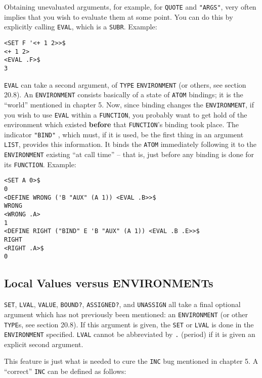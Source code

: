 \documentclass[a4paper]{scrbook}
\begin{document}
Obtaining unevaluated arguments, for example, for \texttt{QUOTE} and \texttt{"ARGS"}, very often
implies that you wish to evaluate them at some point. You can do this by explicitly calling
\texttt{EVAL}, which is a \texttt{SUBR}. Example:

\begin{verbatim}
<SET F '<+ 1 2>>$
<+ 1 2>
<EVAL .F>$
3
\end{verbatim}

\texttt{EVAL} can take a second argument, of \texttt{TYPE} \texttt{ENVIRONMENT} (or
others, see section 20.8). An \texttt{ENVIRONMENT} consists basically of a state of \texttt{ATOM} bindings; it is the
``world'' mentioned in chapter 5. Now, since binding changes the \texttt{ENVIRONMENT}, if you wish to use \texttt{EVAL}
within a \texttt{FUNCTION}, you probably want to get hold of the environment which existed
\textbf{before} that \texttt{FUNCTION}'s binding took place. The indicator \texttt{"BIND"}
, which must, if it is used, be the first thing in an argument \texttt{LIST}, provides this
information. It binds the \texttt{ATOM} immediately following it to the \texttt{ENVIRONMENT} existing ``at call time'' --
that is, just before any binding is done for its \texttt{FUNCTION}. Example:

\begin{verbatim}
<SET A 0>$
0
<DEFINE WRONG ('B "AUX" (A 1)) <EVAL .B>>$
WRONG
<WRONG .A>
1
<DEFINE RIGHT ("BIND" E 'B "AUX" (A 1)) <EVAL .B .E>>$
RIGHT
<RIGHT .A>$
0
\end{verbatim}

\subsection{Local Values versus ENVIRONMENTs}\label{local-values-versus-environments}

\texttt{SET}, \texttt{LVAL}, \texttt{VALUE}, \texttt{BOUND?}, \texttt{ASSIGNED?}, and \texttt{UNASSIGN} all take a final
optional argument which has not previously been mentioned: an \texttt{ENVIRONMENT} (or other
\texttt{TYPE}s, see section 20.8). If this argument is given, the \texttt{SET} or \texttt{LVAL} is done in the
\texttt{ENVIRONMENT} specified. \texttt{LVAL} cannot be abbreviated by \texttt{.} (period) if it is given an explicit
second argument.

This feature is just what is needed to cure the \texttt{INC} bug mentioned in chapter 5. A ``correct'' \texttt{INC} can be
defined as follows:
\end{document}
